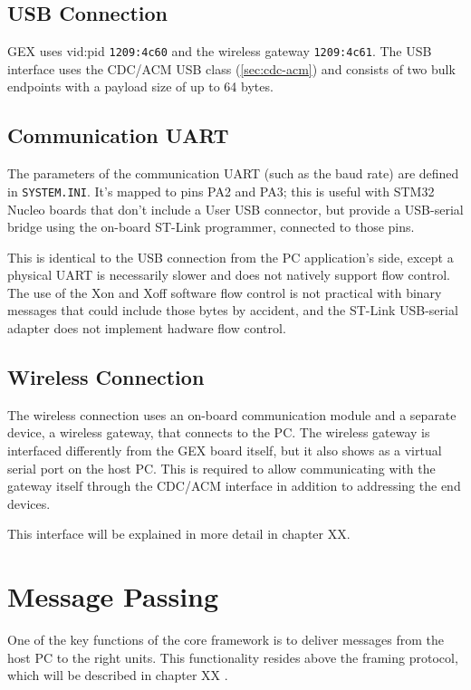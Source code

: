 \subsection{USB Connection}

GEX uses vid:pid \verb|1209:4c60| and the wireless gateway \verb|1209:4c61|. The USB interface uses the CDC/ACM USB class (\ref{sec:cdc-acm}) and consists of two bulk endpoints with a payload size of up to 64 bytes.

\subsection{Communication UART}

The parameters of the communication UART (such as the baud rate) are defined in \verb|SYSTEM.INI|. It's mapped to pins PA2 and PA3; this is useful with STM32 Nucleo boards that don't include a User USB connector, but provide a USB-serial bridge using the on-board ST-Link programmer, connected to those pins. 

This is identical to the USB connection from the PC application's side, except a physical UART is necessarily slower and does not natively support flow control. The use of the Xon and Xoff software flow control is not practical with binary messages that could include those bytes by accident, and the ST-Link USB-serial adapter does not implement hadware flow control.

\subsection{Wireless Connection}

The wireless connection uses an on-board communication module and a separate device, a wireless gateway, that connects to the PC. The wireless gateway is interfaced differently from the GEX board itself, but it also shows as a virtual serial port on the host PC. This is required to allow communicating with the gateway itself through the CDC/ACM interface in addition to addressing the end devices.

This interface will be explained in more detail in chapter XX.

\section{Message Passing}

One of the key functions of the core framework is to deliver messages from the host PC to the right units. This functionality resides above the framing protocol, which will be described in chapter XX .


